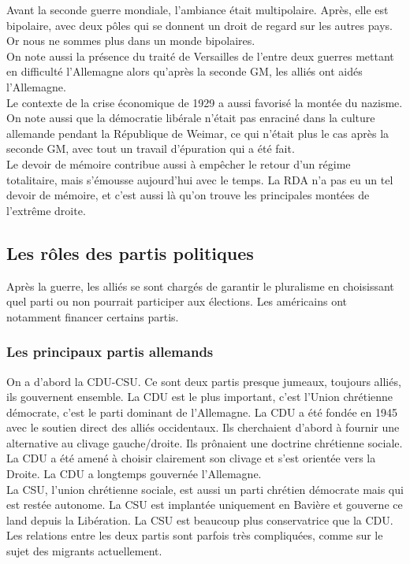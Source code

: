 \documentclass[10pt, a4paper, openany]{book}
\begin{document}
Avant la seconde guerre mondiale, l'ambiance était multipolaire. Après, elle est bipolaire, avec deux pôles qui se donnent un droit de regard sur les autres pays. Or nous ne sommes plus dans un monde bipolaires. \\
On note aussi la présence du traité de Versailles de l'entre deux guerres mettant en difficulté l'Allemagne alors qu'après la seconde GM, les alliés ont aidés l'Allemagne. \\
Le contexte de la crise économique de 1929 a aussi favorisé la montée du nazisme. \\
On note aussi que la démocratie libérale n'était pas enraciné dans la culture allemande pendant la République de Weimar, ce qui n'était plus le cas après la seconde GM, avec tout un travail d'épuration qui a été fait. \\
Le devoir de mémoire contribue aussi à empêcher le retour d'un régime totalitaire, mais s'émousse aujourd'hui avec le temps. La RDA n'a pas eu un tel devoir de mémoire, et c'est aussi là qu'on trouve les principales montées de l'extrême droite. 

\subsection{Les rôles des partis politiques}

Après la guerre, les alliés se sont chargés de garantir le pluralisme en choisissant quel parti ou non pourrait participer aux élections. Les américains ont notamment financer certains partis. 

\subsubsection{Les principaux partis allemands}

On a d'abord la CDU-CSU. Ce sont deux partis presque jumeaux, toujours alliés, ils gouvernent ensemble. La CDU est  le plus important, c'est l'Union chrétienne démocrate, c'est le parti dominant de l'Allemagne. La CDU a été fondée en 1945 avec le soutien direct des alliés occidentaux. Ils cherchaient d'abord à fournir une alternative au clivage gauche/droite. Ils prônaient une doctrine chrétienne sociale. La CDU a été amené à choisir clairement son clivage et s'est orientée vers la Droite. La CDU a longtemps gouvernée l'Allemagne. \\
La CSU, l'union chrétienne sociale, est aussi un parti chrétien démocrate mais qui est restée autonome. La CSU est implantée uniquement en Bavière et gouverne ce land depuis la Libération. La CSU est beaucoup plus conservatrice que la CDU. Les relations entre les deux partis sont parfois très compliquées, comme sur le sujet des migrants actuellement. 
\end{document}
